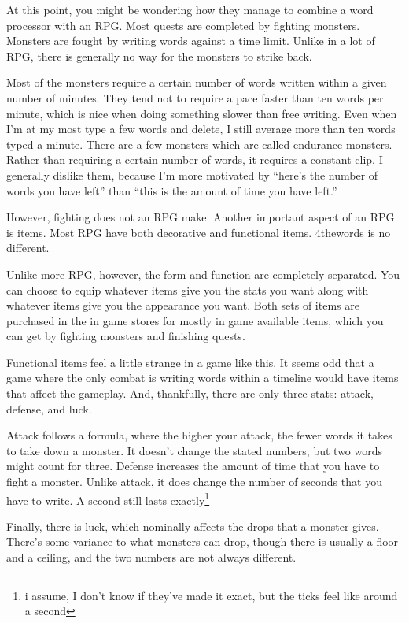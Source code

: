 \documentclass[12pt]{article}[titlepage]
\newcommand{\say}[1]{``#1''}
\renewcommand{\,}{\textsuperscript{,}}
\begin{document}
At this point, you might be wondering how they manage to combine a word processor with an RPG.
Most quests are completed by fighting monsters.
Monsters are fought by writing words against a time limit.
Unlike in a lot of RPG, there is generally no way for the monsters to strike back.

Most of the monsters require a certain number of words written within a given number of minutes.
They tend not to require a pace faster than ten words per minute, which is nice when doing something slower than free writing.
Even when I'm at my most type a few words and delete, I still average more than ten words typed a minute.
There are a few monsters which are called endurance monsters.
Rather than requiring a certain number of words, it requires a constant clip.
I generally dislike them, because I'm more motivated by \say{here's the number of words you have left} than \say{this is the amount of time you have left.}

However, fighting does not an RPG make.
Another important aspect of an RPG is items.
Most RPG have both decorative and functional items.
4thewords is no different.

Unlike more RPG, however, the form and function are completely separated.
You can choose to equip whatever items give you the stats you want along with whatever items give you the appearance you want.
Both sets of items are purchased in the in game stores for mostly in game available items, which you can get by fighting monsters and finishing quests.

Functional items feel a little strange in a game like this.
It seems odd that a game where the only combat is writing words within a timeline would have items that affect the gameplay.
And, thankfully, there are only three stats: attack, defense, and luck.

Attack follows a formula, where the higher your attack, the fewer words it takes to take down a monster.
It doesn't change the stated numbers, but two words might count for three.
Defense increases the amount of time that you have to fight a monster.
Unlike attack, it does change the number of seconds that you have to write.
A second still lasts exactly\footnote{i assume, I don't know if they've made it exact, but the ticks feel like around a second}

Finally, there is luck, which nominally affects the drops that a monster gives.
There's some variance to what monsters can drop, though there is usually a floor and a ceiling, and the two numbers are not always different.
\end{document}
